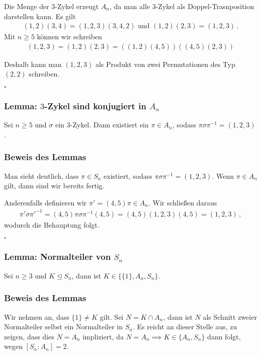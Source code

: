 \documentclass[12pt, german]{article}
\newcommand{\bewiesen}{
	
	\begin{flushright}
		$\square$  \\
\end{flushright}}
\begin{document}
	Die Menge der $3$-Zykel erzeugt $A_n$, da man alle $3$-Zykel als Doppel-Trasnposition darstellen kann.
	Es gilt 
	\begin{align*}
		(1,2)(3,4) = (1,2,3)(3,4,2) \text{ und } (1,2)(2,3) = (1,2,3)\, .
	\end{align*}
	Mit $n\geq 5$ können wir schreiben 
	\begin{align*}
		(1,2, 3) = (1,2)(2,3) =((1,2)(4,5))((4,5)(2,3))
	\end{align*}
	
	Deshalb kann man $(1,2,3)$ als Produkt von zwei Permutationen des Typ $(2,2)$ schreiben.
	\bewiesen
	
	\subsubsection{Lemma: $3$-Zykel sind konjugiert in $A_n$}
	Sei $n \geq 5$ und $\sigma$ ein $3$-Zykel. Dann existiert ein $\pi \in A_n$, sodass $\pi\sigma\pi^{-1} = (1,2,3)$.
	
	\subsubsection{Beweis des Lemmas}
	Man sieht deutlich, dass $\pi \in S_n$ existiert, sodass $\pi\sigma\pi^{-1} = (1,2,3)$. 
	Wenn $\pi \in A_n$ gilt, dann sind wir bereits fertig. 
	\newline
	
	Anderenfalls definieren wir $\pi' = (4,5)\pi \in A_n$.  Wir schlie\ss en daraus 
	\begin{align*}
		\pi'\sigma\pi'^{-1} = (4,5)\pi\sigma\pi^{-1}(4,5) = (4,5)(1,2,3)(4,5) = (1,2,3)\,,
	\end{align*}
	wodurch die Behauptung folgt.
	\bewiesen
	
	\subsubsection{Lemma: Normalteiler von $S_n$}
	Sei $n \geq 3$ und $K \trianglelefteq S_n$, dann ist $K \in \{ \{1\}, A_n, S_n\}$.
	
	\subsubsection{Beweis des Lemmas}
	Wir nehmen an, dass $\{1\} \not = K$ gilt. Sei $N= K \cap A_n$, dann ist $N$ als Schnitt zweier Normalteiler selbst ein Normalteiler in $S_n$. Es reicht an dieser Stelle aus, zu zeigen, dass dies $N=A_n$ impliziert, da $N = A_n \implies K \in \{ A_n, S_n\}$ dann folgt, wegen $[S_n : A_n] = 2$.
	\newline
	
\end{document}
